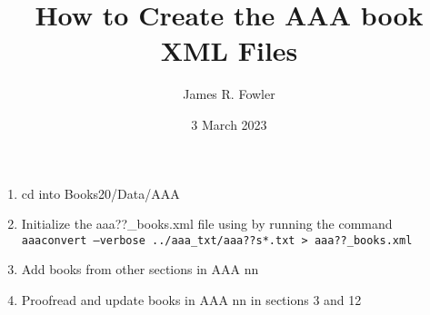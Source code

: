 \documentclass{article}
\begin{document}
\title{How to Create the AAA book XML Files}
\author{James R. Fowler}
\date{3 March 2023}

\maketitle

\begin{enumerate}
  \item cd into Books20/Data/AAA
\item Initialize the aaa??\_books.xml file using by running the
  command \\
  \texttt{aaaconvert --verbose ../aaa\_txt/aaa??s*.txt > aaa??\_books.xml}

\item Add books from other sections in AAA nn

\item Proofread and update books in AAA nn in sections 3 and 12

\end{enumerate}
\end{document}
